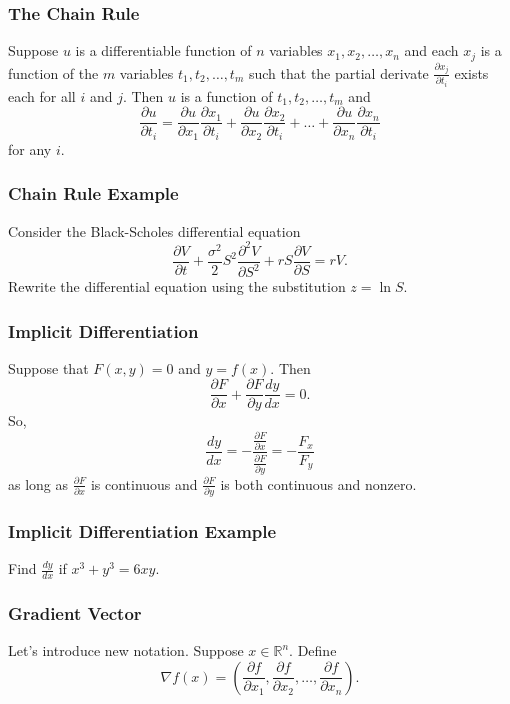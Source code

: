 \documentclass{beamer}
\begin{document}
\begin{frame}
\frametitle{The Chain Rule}

Suppose $u$ is a differentiable function of $n$ variables $x_1, x_2,\ldots, x_n$ and each $x_j$ is a function of the $m$ variables $t_1, t_2,\ldots, t_m$ such that the partial derivate $\frac{\partial x_j}{\partial t_i}$ exists each for all $i$ and $j$. Then $u$ is a function of $t_1, t_2,\ldots, t_m$ and
$$
\frac{\partial u}{\partial t_i} = \frac{\partial u}{\partial x_1}\frac{\partial x_1}{\partial t_i} + \frac{\partial u}{\partial x_2}\frac{\partial x_2}{\partial t_i} + \ldots + \frac{\partial u}{\partial x_n}\frac{\partial x_n}{\partial t_i}
$$
for any $i$.

\end{frame}

\begin{frame}[t]
\frametitle{Chain Rule Example}
\begin{Example}
Consider the Black-Scholes differential equation
$$
\frac{\partial V}{\partial t} + \frac{\sigma^2}{2} S^2 \frac{\partial^2 V}{\partial S^2} + r S \frac{\partial V}{\partial S} = r V.
$$
Rewrite the differential equation using the substitution $z = \ln S$.
\end{Example}

\end{frame}

\begin{frame}
\frametitle{Implicit Differentiation}
Suppose that $F(x, y) = 0$ and $y = f(x)$. Then
$$
\frac{\partial F}{\partial x} + \frac{\partial F}{\partial y} \frac{d y}{d x} = 0.
$$
So,
$$
\frac{dy}{dx} = -\frac{\frac{\partial F}{\partial x}}{\frac{\partial F}{\partial y}}= - \frac{F_x}{F_y}
$$
as long as $\frac{\partial F}{\partial x}$ is continuous and $\frac{\partial F}{\partial y}$ is both continuous and nonzero.
\end{frame}

\begin{frame}[t]
\frametitle{Implicit Differentiation Example}
\begin{Example}
Find $\frac{dy}{dx}$ if $x^3 + y^3 = 6xy$.
\end{Example}
\end{frame}

\begin{frame}
\frametitle{Gradient Vector}
Let's introduce new notation. Suppose $x\in\mathbb{R}^n$. Define
$$
\nabla f(x) = \left(\frac{\partial f}{\partial x_1}, \frac{\partial f}{\partial x_2},\ldots, \frac{\partial f}{\partial x_n}\right).
$$
\end{frame}
\end{document}
